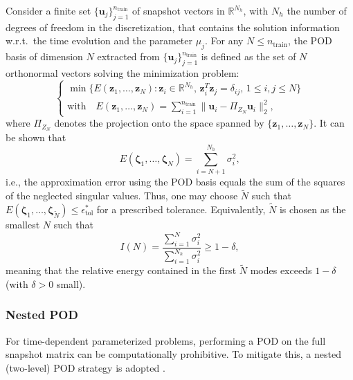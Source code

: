 \documentclass[reqno]{amsart}[standalone]
\theoremstyle{definition}
\theoremstyle{remark}
\newcommand{\R}{\mathbb{R}}
\newcommand{\bs}{\boldsymbol}
\begin{document}
Consider a finite set $\{\bs{u}_j\}_{j=1}^{n_{\text{train}}}$ of snapshot vectors in $\R^{N_h}$, with $N_h$ the number of degrees of freedom in the discretization, that contains the solution information w.r.t.\ the time evolution and the parameter $\mu_j$.
%
For any $N \leq n_{\text{train}}$, the POD basis of dimension $N$ extracted from $\{\bs{u}_j\}_{j=1}^{n_{\text{train}}}$ is defined as the set of $N$ orthonormal vectors solving the minimization problem:
\begin{equation}\label{eqPOD2}
\begin{cases}
\min\{E(\bs{z}_1, \ldots, \bs{z}_N) : \bs{z}_i \in \R^{N_h}, \, \bs{z}_i^T \bs{z}_j = \delta_{ij}, \, 1 \leq i,j \leq N\}\\[1mm]
\text{with} \quad E(\bs{z}_1, \ldots, \bs{z}_N) = \sum_{i=1}^{n_{\text{train}}} \| \bs{u}_i - \Pi_{Z_N} \bs{u}_i \|^2_2,
\end{cases}
\end{equation}
where $\Pi_{Z_N}$ denotes the projection onto the space spanned by $\{\bs{z}_1,\dots,\bs{z}_N\}$.
It can be shown that
\begin{equation*}
E(\bs{\zeta}_1, \ldots, \bs{\zeta}_N) = \sum_{i=N+1}^{N_h} \sigma_i^2,
\end{equation*}
i.e., the approximation error using the POD basis equals the sum of the squares of the neglected singular values.
Thus, one may choose $\tilde{N}$ such that $E(\bs{\zeta}_1, \ldots, \bs{\zeta}_{\tilde{N}}) \leq \epsilon_{\text{tol}}^*$ for a prescribed tolerance. Equivalently, $\tilde{N}$ is chosen as the smallest $N$ such that
\begin{equation}\label{eq:POD_ENERGY}
I(N) = \frac{\sum_{i=1}^{N} \sigma_i^2}{\sum_{i=1}^{N_h} \sigma_i^2} \geq 1 - \delta,
\end{equation}
meaning that the relative energy contained in the first $\tilde{N}$ modes exceeds $1-\delta$ (with $\delta>0$ small).
%

\subsubsection{Nested POD}\label{subsectNESTED_POD}
For time-dependent parameterized problems, performing a POD on the full snapshot matrix can be computationally prohibitive. To mitigate this, a nested (two-level) POD strategy is adopted \parencite{nested_POD1, nested_POD2}.
\end{document}

